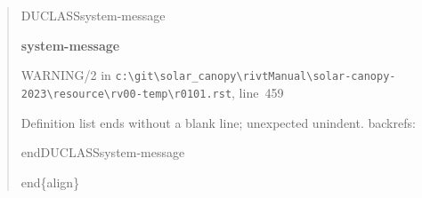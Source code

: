 \documentclass[12pt,notitle,letterpaper]{report}
\newenvironment{DUclass}[1]%
  {%
   \def\DocutilsClassFunctionName{DUCLASS#1}
     \csname \DocutilsClassFunctionName \endcsname}%
  {\csname end\DocutilsClassFunctionName \endcsname}%
\newenvironment{DUadmonition}%
  {\begin{center}
     \begin{lrbox}{\DUadmonitionbox}
       \begin{minipage}{0.9\linewidth}
  }%
  {    \end{minipage}
     \end{lrbox}
     \fbox{\usebox{\DUadmonitionbox}}
   \end{center}
  }
\providecommand*{\DUtitle}[1]{%
  \smallskip\noindent\textbf{#1}\smallskip}
\begin{document}
\begin{quote}
\begin{description}
\end{description}

\begin{DUclass}{system-message}
\begin{DUadmonition}
\DUtitle{system-message
}

{\color{red}WARNING/2} in \texttt{c:\textbackslash{}git\textbackslash{}solar\_canopy\textbackslash{}rivtManual\textbackslash{}solar-canopy-2023\textbackslash{}resource\textbackslash{}rv00-temp\textbackslash{}r0101.rst}, line~459

Definition list ends without a blank line; unexpected unindent.
backrefs: \end{DUadmonition}
\end{DUclass}

end\{align\}
\end{quote}
\end{document}
